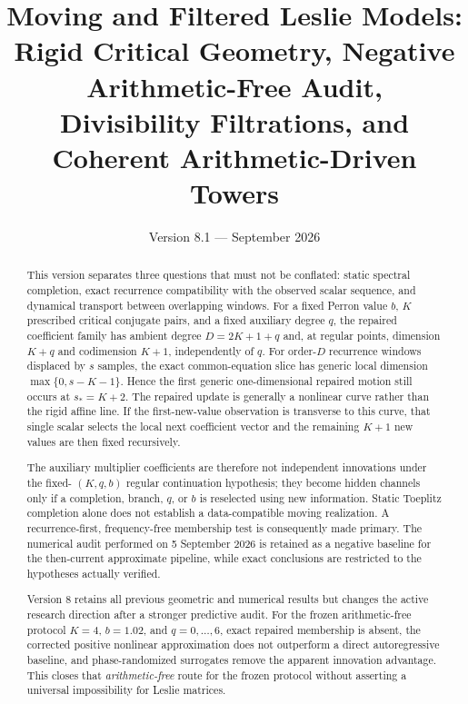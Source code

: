 \documentclass[11pt]{amsart}
\title[Arithmetic-Driven Leslie Towers]{Moving and Filtered Leslie Models:\\Rigid Critical Geometry, Negative Arithmetic-Free Audit,\\Divisibility Filtrations, and Coherent Arithmetic-Driven Towers}
\author{}
\date{Version 8.1 --- September 2026}
\numberwithin{equation}{section}
\theoremstyle{plain}
\theoremstyle{definition}
\theoremstyle{remark}
\begin{document}
\begin{abstract}
This version separates three questions that must not be conflated: static spectral completion,
exact recurrence compatibility with the observed scalar sequence, and dynamical transport between
overlapping windows. For a fixed Perron value $b$, $K$ prescribed critical conjugate pairs, and a
fixed auxiliary degree $q$, the repaired coefficient family has ambient degree $D=2K+1+q$ and,
at regular points, dimension $K+q$ and codimension $K+1$, independently of $q$. For order-$D$
recurrence windows displaced by $s$ samples, the exact common-equation slice has generic local
dimension $\max\{0,s-K-1\}$. Hence the first generic one-dimensional repaired motion still occurs
at $s_*=K+2$. The repaired update is generally a nonlinear curve rather than the rigid affine line.
If the first-new-value observation is transverse to this curve, that single scalar selects the local
next coefficient vector and the remaining $K+1$ new values are then fixed recursively.

The auxiliary multiplier coefficients are therefore not independent innovations under the fixed-
$(K,q,b)$ regular continuation hypothesis; they become hidden channels only if a completion,
branch, $q$, or $b$ is reselected using new information. Static Toeplitz completion alone does not
establish a data-compatible moving realization. A recurrence-first, frequency-free membership test
is consequently made primary. The numerical audit performed on 5 September 2026 is retained as a
negative baseline for the then-current approximate pipeline, while exact conclusions are restricted
to the hypotheses actually verified.

Version 8 retains all previous geometric and numerical results but changes the active research
direction after a stronger predictive audit.  For the frozen arithmetic-free protocol
$K=4$, $b=1.02$, and $q=0,\ldots,6$, exact repaired membership is absent, the corrected
positive nonlinear approximation does not outperform a direct autoregressive baseline, and
phase-randomized surrogates remove the apparent innovation advantage.  This closes that
\emph{arithmetic-free} route for the frozen protocol without asserting a universal impossibility
for Leslie matrices.


\end{abstract}
\end{document}
